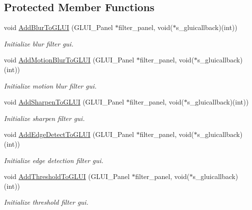 \subsection*{Protected Member Functions}
\begin{DoxyCompactItemize}
\item 
void \hyperlink{classimage__tools_1_1FilterManager_ae85ce9fc1146be4b403187064bb7cd97}{Add\+Blur\+To\+G\+L\+UI} (G\+L\+U\+I\+\_\+\+Panel $\ast$filter\+\_\+panel, void($\ast$s\+\_\+gluicallback)(int))
\begin{DoxyCompactList}\small\item\em Initialize blur filter gui. \end{DoxyCompactList}\item 
void \hyperlink{classimage__tools_1_1FilterManager_a023cb6f79a31c7635c73aed94ad8f684}{Add\+Motion\+Blur\+To\+G\+L\+UI} (G\+L\+U\+I\+\_\+\+Panel $\ast$filter\+\_\+panel, void($\ast$s\+\_\+gluicallback)(int))
\begin{DoxyCompactList}\small\item\em Initialize motion blur filter gui. \end{DoxyCompactList}\item 
void \hyperlink{classimage__tools_1_1FilterManager_aaeaa991e824af5651604240bf6841f4d}{Add\+Sharpen\+To\+G\+L\+UI} (G\+L\+U\+I\+\_\+\+Panel $\ast$filter\+\_\+panel, void($\ast$s\+\_\+gluicallback)(int))
\begin{DoxyCompactList}\small\item\em Initialize sharpen filter gui. \end{DoxyCompactList}\item 
void \hyperlink{classimage__tools_1_1FilterManager_a8ea1737814292a8248e87f68772bba84}{Add\+Edge\+Detect\+To\+G\+L\+UI} (G\+L\+U\+I\+\_\+\+Panel $\ast$filter\+\_\+panel, void($\ast$s\+\_\+gluicallback)(int))
\begin{DoxyCompactList}\small\item\em Initialize edge detection filter gui. \end{DoxyCompactList}\item 
void \hyperlink{classimage__tools_1_1FilterManager_a7886a22bba28b6a4d47e4da8dcf6e500}{Add\+Threshold\+To\+G\+L\+UI} (G\+L\+U\+I\+\_\+\+Panel $\ast$filter\+\_\+panel, void($\ast$s\+\_\+gluicallback)(int))
\begin{DoxyCompactList}\small\item\em Initialize threshold filter gui. \end{DoxyCompactList}\item 

\end{DoxyCompactItemize}
